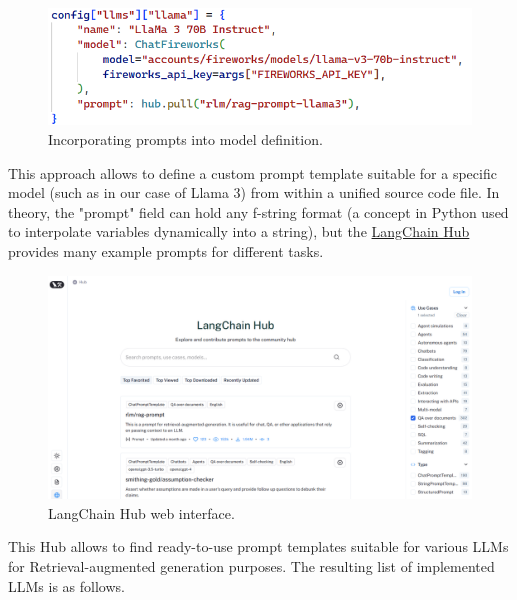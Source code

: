 \begin{figure}[htbp]
    \centering
    \includegraphics[width=\linewidth]{./figures/prompt-template-impl.png}
    \caption{Incorporating prompts into model definition.}
\end{figure}
This approach allows to define a custom prompt template suitable for a specific model (such as in our case of Llama 3) from within a unified source code file. In theory, the "prompt" field can hold any f-string format (a concept in Python used to interpolate variables dynamically into a string), but the \href{https://smith.langchain.com/hub}{LangChain Hub} provides many example prompts for different tasks.
\begin{figure}[htbp]
    \centering
    \includegraphics[width=\linewidth]{./figures/langchain-hub.png}
    \caption{LangChain Hub web interface.}
\end{figure}\newline
This Hub allows to find ready-to-use prompt templates suitable for various LLMs for Retrieval-augmented generation purposes.\medskip\newline
The resulting list of implemented LLMs is as follows.
